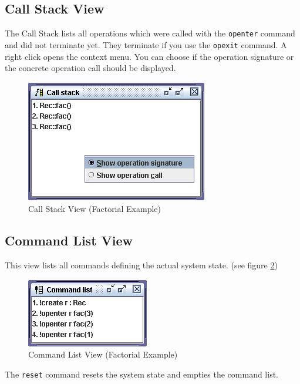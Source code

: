 \documentclass[a4paper,titlepage,oneside,final]{scrreprt} %
\begin{document}
\subsection{Call Stack View}\label{callstackview}
The Call Stack lists all operations which were called with
the \verb+openter+ command and did not terminate yet. They
terminate if you use the \verb+opexit+ command.
A right click opens the context menu. You can choose
if the operation signature or the concrete operation call
should be displayed.
\begin{figure}[ht]
\centering
\includegraphics[scale=0.7]{Screenshots/GUI/Views/CallStackView.png}
\caption{Call Stack View (Factorial Example)}
\label{fig:CallStackView}
\end{figure}
\subsection{Command List View}\label{commandlistview}
This view lists all commands defining the actual system state. (see figure \ref{fig:CommandListView})
\begin{figure}[ht]
\centering
\includegraphics[scale=0.7]{Screenshots/GUI/Views/CommandListView.png}
\caption{Command List View (Factorial Example)}
\label{fig:CommandListView}
\end{figure}
The \verb+reset+ command resets the system state and
empties the command list.
\end{document}
